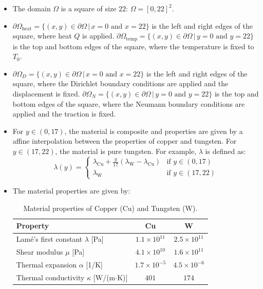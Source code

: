 \documentclass[a4paper,12pt,twoside]{report}
\begin{document}
\begin{itemize}
	\item The domain $\Omega$ is a square of size $22$: $\Omega = [0,22]^2$.
	\item $\partial \Omega_{\text{heat}} = \{(x,y) \in \partial \Omega \,|\, x = 0 \text{ and } x = 22 \}$ is the left and right edges of the square, where heat $Q$ is applied. $\partial \Omega_{\text{temp}} = \{(x,y) \in \partial \Omega \,|\, y = 0 \text{ and } y = 22\}$ is the top and bottom edges of the square, where the temperature is fixed to $T_0$.
	\item $\partial \Omega_{D} = \{(x,y) \in \partial \Omega \,|\, x = 0 \text{ and } x = 22 \}$ is the left and right edges of the square, where the Dirichlet boundary conditions are applied and the displacement is fixed. $\partial \Omega_{N} = \{(x,y) \in \partial \Omega \,|\, y = 0 \text{ and } y = 22\}$ is the top and bottom edges of the square, where the Neumann boundary conditions are applied and the traction is fixed.
	\item For $y \in (0, 17)$, the material is composite and properties are given by a affine interpolation between the properties of copper and tungsten. For $y \in (17, 22)$, the material is pure tungsten.
	For example, $\lambda$ is defined as:
	\[\lambda(y) = \begin{cases}
		\lambda_{\text{Cu}} + \frac{y}{17}(\lambda_{\text{W}} - \lambda_{\text{Cu}}) & \text{if } y \in (0, 17) \\
		\lambda_{\text{W}} & \text{if } y \in (17, 22)
	\end{cases}\]
	\item The material properties are given by: 
	\begin{table}[h!]
	\centering
	\begin{tabular}{lcc}
	\hline
	\textbf{Property} & \textbf{Cu} & \textbf{W} \\
	\hline
	Lamé's first constant $\lambda$ [Pa] & $1.1\times 10^{11}$ & $2.5\times 10^{11}$ \\
	Shear modulus $\mu$ [Pa]             & $4.1\times 10^{10}$ & $1.6\times 10^{11}$ \\
	Thermal expansion $\alpha$ [1/K]     & $1.7\times 10^{-5}$ & $4.5\times 10^{-6}$ \\
	Thermal conductivity $\kappa$ [W/(m$\cdot$K)] & $401$ & $174$ \\
	\hline
	\end{tabular}
	\caption{Material properties of Copper (Cu) and Tungsten (W).}
	\end{table}
\end{itemize}
\end{document}
